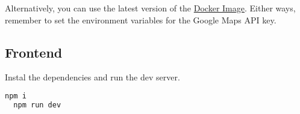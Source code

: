 \documentclass{article}
\begin{document}
Alternatively, you can use the latest version of the \href{https://hub.docker.com/repository/docker/mcmc101001/where-to-eat-backend/general}{Docker Image}. Either ways, remember to set the environment variables for the Google Maps API key.

\subsection{Frontend}
Instal the dependencies and run the dev server.

\begin{lstlisting}[language=bash]
  npm i
  npm run dev
\end{lstlisting}
\end{document}
